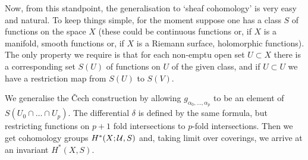 Now, from this standpoint, the generalisation to ‘sheaf cohomology’ is very easy and natural. To keep things simple, for the moment suppose one has a class $S$ of functions on the space $X$ (these could be continuous functions or, if $X$ is a manifold, smooth functions or, if $X$ is a Riemann surface, holomorphic functions). The only property we require is that for each non-emptu open set $U\subset X$ there is a corresponding set $S(U)$ of functions on $U$ of the given class, and if $U\subset U$ we have a restriction map from $S(U)$ to $S(V)$.

We generalise the \v Cech construction by allowing $g_{\alpha_0,\ldots,\alpha_p}$ to be an element of $S(U_0\cap\ldots\cap U_p)$. The differential $\delta$ is defined by the same formula, but restricting functions on $p+1$ fold intersections to $p$-fold intersections.  Then we get cohomology groups $H^*(X;\mathcal{U},S)$ and, taking limit over coverings, we arrive at an invariant $H^*(X,S)$.

